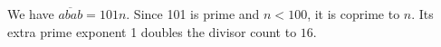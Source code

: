 We have $\overline{abab}=101n $. Since 101 is prime and $ n<100 $, it is coprime to $ n $. Its extra prime exponent 1 doubles the divisor count to $\boxed{16}$.
